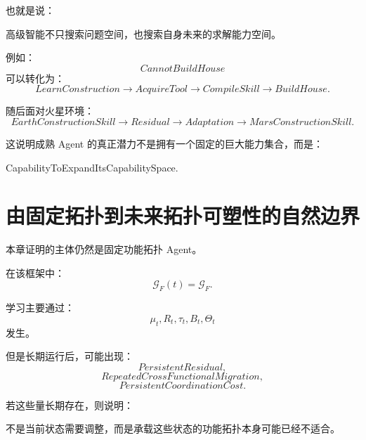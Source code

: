 也就是说：
\begin{statementbox}
高级智能不只搜索问题空间，也搜索自身未来的求解能力空间。
\end{statementbox}

例如：
\begin{equation}
CannotBuildHouse
\end{equation}
可以转化为：
\begin{equation}
LearnConstruction
\rightarrow
AcquireTool
\rightarrow
CompileSkill
\rightarrow
BuildHouse.
\end{equation}

随后面对火星环境：
\begin{equation}
EarthConstructionSkill
\rightarrow
Residual
\rightarrow
Adaptation
\rightarrow
MarsConstructionSkill.
\end{equation}

这说明成熟 Agent 的真正潜力不是拥有一个固定的巨大能力集合，而是：

\begin{statementbox}
CapabilityToExpandItsCapabilitySpace.
\end{statementbox}

\section{由固定拓扑到未来拓扑可塑性的自然边界}

本章证明的主体仍然是固定功能拓扑 Agent。

在该框架中：
\begin{equation}
\mathcal G_F(t)
=
\mathcal G_F.
\end{equation}

学习主要通过：
\begin{equation}
\mu_t,
R_t,
\tau_t,
B_t,
\Theta_t
\end{equation}
发生。

但是长期运行后，可能出现：
\begin{equation}
PersistentResidual,
\end{equation}
\begin{equation}
RepeatedCrossFunctionalMigration,
\end{equation}
\begin{equation}
PersistentCoordinationCost.
\end{equation}

若这些量长期存在，则说明：
\begin{statementbox}
不是当前状态需要调整，而是承载这些状态的功能拓扑本身可能已经不适合。
\end{statementbox}

